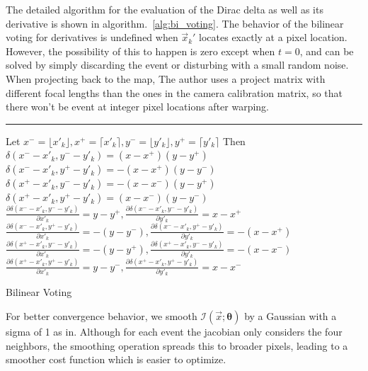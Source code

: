 The detailed algorithm for the evaluation of the Dirac delta as well
as its derivative is shown in algorithm.~\ref{alg:bi_voting}. The
behavior of the bilinear voting for derivatives is undefined when
$\vec{x}_k'$ locates exactly at a pixel location. However, the
possibility of this to happen is zero except when $t=0$, and can be
solved by simply discarding the event or disturbing with a small
random noise. When projecting back to the map, The author uses a
project matrix with different focal lengths than the ones in the
camera calibration matrix, so that there won't be event at integer
pixel locations after warping.
\begin{algorithm}
  \DontPrintSemicolon \SetAlgoLined {}
    
  \hrule\; Let\;
  $x^-=\lfloor x'_k\rfloor, x^+=\lceil x'_k\rceil,y^-=\lfloor
  y'_k\rfloor, y^+=\lceil y'_k\rceil$\; Then\;
  $\delta(x^--x'_k,y^--y'_k)=(x-x^+)(y-y^+)$\;
  $\delta(x^--x'_k,y^+-y'_k)=-(x-x^+)(y-y^-)$\;
  $\delta(x^+-x'_k,y^--y'_k)=-(x-x^-)(y-y^+)$\;
  $\delta(x^+-x'_k,y^+-y'_k)=(x-x^-)(y-y^-)$\;
  $\frac{\partial\delta(x^--x'_k,y^--y'_k)}{\partial
    x'_k}=y-y^+,\frac{\partial\delta(x^--x'_k,y^--y'_k)}{\partial
    y'_k}=x-x^+$\;
  $\frac{\partial\delta(x^--x'_k,y^+-y'_k)}{\partial
    x'_k}=-(y-y^-),\frac{\partial\delta(x^--x'_k,y^+-y'_k)}{\partial
    y'_k}=-(x-x^+)$\;
  $\frac{\partial\delta(x^+-x'_k,y^--y'_k)}{\partial
    x'_k}=-(y-y^+),\frac{\partial\delta(x^+-x'_k,y^--y'_k)}{\partial
    y'_k}=-(x-x^-)$\;
  $\frac{\partial\delta(x^+-x'_k,y^+-y'_k)}{\partial
    x'_k}=y-y^-,\frac{\partial\delta(x^+-x'_k,y^+-y'_k)}{\partial
    y'_k}=x-x^-$\;
  \caption{Bilinear Voting}
  \label{alg:bi_voting}
\end{algorithm}
\BlankLine For better convergence behavior, we smooth
$\mathcal{I}\left(\vec{x};\bm{\theta}\right)$ by a Gaussian with a
sigma of 1 as in\citep{gallego2017accurate}. Although for each event
the jacobian only considers the four neighbors, the smoothing
operation spreads this to broader pixels, leading to a smoother cost
function which is easier to optimize.
